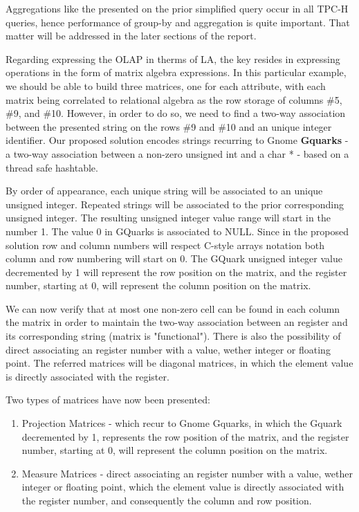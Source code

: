 Aggregations like the presented on the prior simplified query occur in all TPC-H queries, hence performance of group-by and aggregation is quite important. That matter will be addressed in the later sections of the report.\par 
Regarding expressing the OLAP  in therms of LA, the key resides in expressing operations in the form of matrix algebra expressions.  In this particular example, we should be able to build three matrices, one for each attribute, with each matrix being correlated to relational algebra as the row storage of columns \#5, \#9, and \#10. However, in order to do so, we need to find a two-way association between the presented string on the rows \#9 and \#10 and an unique integer identifier. Our proposed solution encodes strings recurring to Gnome \textbf{Gquarks} \cite{gquarks} - a two-way association between a non-zero unsigned int and a char * - based on a thread safe hashtable. \par 
By order of appearance, each unique string will be associated to an unique unsigned integer. Repeated strings will be associated to the prior corresponding unsigned integer. The resulting unsigned integer value range will start in the number 1. The value 0 in GQuarks is associated to NULL. Since in the proposed solution row and column numbers will respect  C-style arrays notation both column and row numbering will start on 0. The GQuark unsigned integer value decremented by 1  will represent the row position on the matrix, and the register number, starting at 0, will represent the column position on the matrix. \par 
We can now verify that at most one non-zero cell can be found in each column the matrix in order to maintain the two-way association between an register and its corresponding string (matrix is "functional"). There is also the possibility of direct associating an register number with a value, wether integer or floating point. The referred matrices will be diagonal matrices, in which the element value is directly associated with the register.\par 
Two types of matrices have now been presented:
\label{definition_matrices}
\begin{enumerate}
\item Projection Matrices - which recur to Gnome Gquarks, in which the Gquark decremented by 1, represents the row position of the matrix, and the register number, starting at 0, will represent the column position on the matrix.
\item Measure Matrices -  direct associating an register number with a value, wether integer or floating point,  which the element value is directly associated with the register number, and consequently the column and row position.
\end{enumerate}
 
